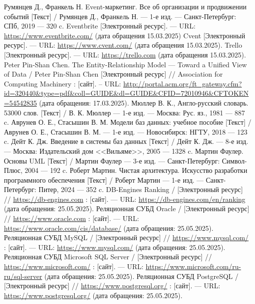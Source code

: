\begin{thebibliography}{}
	 Румянцев Д., Франкель Н. Event-маркетинг. Все об организации и продвижении событий [Текст] / Румянцев Д., Франкель Н. — 1-е изд. — Санкт-Петербург: СПб, 2019 — 320 c.
	 Eventbrite [Электронный ресурс]. — URL:  \url{https://www.eventbrite.com/} (дата обращения 15.03.2025)
	 Cvent [Электронный ресурс]. — URL: \url{https://www.cvent.com/} (дата обращения 15.03.2025).
	 Trello [Электронный ресурс]. — URL: \url{https://trello.com} (дата обращения 15.03.2025).
	 Peter Pin-Shan Chen. The Entity-Relationship Model — Toward a Unified View of Data / Peter Pin-Shan Chen [Электронный ресурс] // Association for Computing Machinery : [сайт]. -- URL: \url{http://portal.acm.org/ft_gateway.cfm?id=320440&type=pdf&coll=GUIDE&dl=GUIDE&CFID=72010946&CFTOKEN=54542835} (дата обращения: 17.03.2025).
	 Мюллер В. К., Англо-русский словарь. 53000 слов. [Текст] / В. К. Мюллер — 1-е изд. — Москва: Рус. яз., 1981 — 887 c.
	 Аврунев О. Е., Стасышин В. М. Модели баз данных: учебное пособие [Текст] / Аврунев О. Е., Стасышин В. М. — 1-е изд. — Новосибирск: НГТУ, 2018 — 123 c.
	 Дейт К. Дж. Введение в системы баз данных [Текст] / Дейт К. Дж. — 8-е изд. — Москва: Издательский дом <<Вильяме>>, 2005 — 1328 c.
	 Мартин Фаулер. Основы UML [Текст] / Мартин Фаулер — 3-е изд. — Санкт-Петербург: Символ-Плюс, 2004 — 192 c.
	 Роберт Мартин. Чистая архитектура. Искусство разработки программного обеспечения [Текст] / Роберт Мартин — 1-е изд. — Санкт-Петербург: Питер, 2024 — 352 c.
	  DB-Engines Ranking /  [Электронный ресурс] // \url{https://db-engines.com} : [сайт]. — URL: \url{https://db-engines.com/en/ranking} (дата обращения: 25.05.2025).
	  Реляционная СУБД Oracle /  [Электронный ресурс] // \url{https://www.oracle.com} : [сайт]. — URL: \url{https://www.oracle.com/cis/database/} (дата обращения: 25.05.2025).
	  Реляционная СУБД MySQL /  [Электронный ресурс] // \url{https://www.mysql.com/} : [сайт]. — URL: \url{https://www.mysql.com/} (дата обращения: 25.05.2025).
	  Реляционная СУБД Microsoft SQL Server /  [Электронный ресурс] // \url{https://www.microsoft.com/} : [сайт]. — URL: \url{https://www.microsoft.com/ru-ru/sql-server} (дата обращения: 25.05.2025).
	  Реляционная СУБД PostgreSQL /  [Электронный ресурс] // \url{https://www.postgresql.org/} : [сайт]. — URL: \url{https://www.postgresql.org/} (дата обращения: 25.05.2025).

\end{thebibliography}
